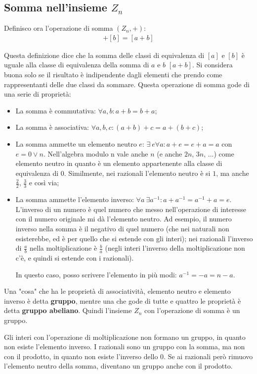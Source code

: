 \subsection{Somma nell'insieme $Z_n$} Definisco ora l'operazione di somma $(Z_n, +)$:
\begin{align*}
    [a] + [b] = [a + b]
\end{align*}

\noindent Questa definizione dice che la somma delle classi di equivalenza di $[a]$ e $[b]$ è uguale alla classe di equivalenza della somma di $a$ e $b$ $[a+b]$. Si considera buona solo se il risultato è indipendente dagli elementi che prendo come rappresentanti delle due classi da sommare. Questa operazione di somma gode di una serie di proprietà:
\begin{itemize}
    \item La somma è commutativa: $\forall a, b: a+b=b+a$;
    \item La somma è associativa: $\forall a, b, c: (a+b)+c=a+(b+c)$;
    \item La somma ammette un elemento neutro $e$: $\exists \ e \forall a: a+e=e+a=a$ con $e= 0 \lor n$. Nell'algebra modulo n vale anche $n$ (e anche $2n$, $3n$, ...) come elemento neutro in quanto è un elemento appartenente alla classe di equivalenza di $0$. Similmente, nei razionali l'elemento neutro è si $1$, ma anche ${\frac{2}{2}}$, ${\frac{3}{3}}$ e così via;
    \item La somma ammette l'elemento inverso: $\forall a \ \exists a^{-1} : a+a^{-1} = a^{-1}+a = e$. L'inverso di un numero è quel numero che messo nell'operazione di interesse con il numero originale mi dà l'elemento neutro. Ad esempio, il numero inverso nella somma è il negativo di quel numero (che nei naturali non esisterebbe, ed è per quello che si estende con gli interi); nei razionali l'inverso di $\frac{a}{b}$ nella moltiplicazione è $\frac{b}{a}$ (negli interi l'inverso della moltiplicazione non c'è, e quindi si estende con i razionali). 
    
    In questo caso, posso scrivere l'elemento in più modi: $a^{-1}=-a=n-a$.
\end{itemize}

\noindent Una "cosa" che ha le proprietà di associatività, elemento neutro e elemento inverso è detta \textbf{gruppo}, mentre una che gode di tutte e quattro le proprietà è detta \textbf{gruppo abeliano}. Quindi l'insieme $Z_n$ con l'operazione di somma è un gruppo.

Gli interi con l'operazione di moltiplicazione non formano un gruppo, in quanto non esiste l'elemento inverso. I razionali sono un gruppo con la somma, ma non con il prodotto, in quanto non esiste l'inverso dello $0$. Se ai razionali però rimuovo l'elemento neutro della somma, diventano un gruppo anche con il prodotto.

